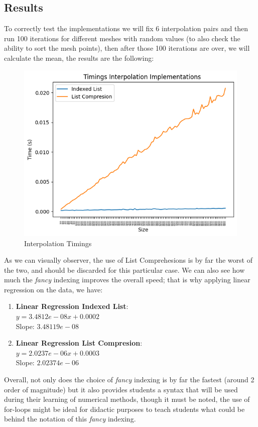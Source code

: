 \subsection{Results}
To correctly test the implementations we will fix 6 interpolation pairs and then run 100 iterations for different meshes with random values (to also check the ability to sort the mesh points), then after those 100 iterations are over, we will calculate the mean, the results are the following:
\begin{figure}[H]
    \centering
    \includegraphics[scale=0.9]{Include/Images/Thesis/Analysis of Solutions/Interpolation/Interpolation Timings.png}
    \caption{Interpolation Timings}
    \label{fig:Interpolation Timings}
\end{figure}

As we can visually observer, the use of List Comprehesions is by far the worst of the two, and should be discarded for this particular case. We can also see how much the \textit{fancy} indexing improves the overall speed; that is why applying linear regression on the data, we have:
\begin{enumerate}
    \item \textbf{Linear Regression Indexed List}: \\
        $y = 3.4812e-08x + 0.0002$ \\
        Slope: $3.48119e-08$
    \item \textbf{Linear Regression List Compresion}: \\
        $y = 2.0237e-06x + 0.0003$ \\
        Slope: $2.02374e-06$
\end{enumerate}

Overall, not only does the choice of \textit{fancy} indexing is by far the fastest (around 2 order of magnitude) but it also provides students a syntax that will be used during their learning of numerical methods, though it must be noted, the use of for-loops might be ideal for didactic purposes to teach students what could be behind the notation of this \textit{fancy} indexing.